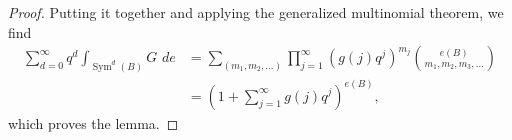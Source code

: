 \documentclass[12pt]{amsart}
\theoremstyle{definition}
\newcommand{\Sym}{\operatorname{Sym}}
\begin{document}
\begin{proof}
Putting it together and applying the generalized multinomial theorem,
we find
\begin{align*}
\sum _{d=0}^{\infty } q^d \int _{\Sym ^{d} (B)} G\,\,de & = \sum _{(m_{1},m_{2},\dots )} \prod _{j=1}^{\infty } \left(g (j) q^{j} \right)^{m_{j}} \binom{e (B)}{m_{1},m_{2},m_{3},\dots }\\
&=\left(1+\sum _{j=1}^{\infty }g (j) q^{j} \right)^{e (B)},
\end{align*}
which proves the lemma.   
\end{proof}







   
\end{document}

